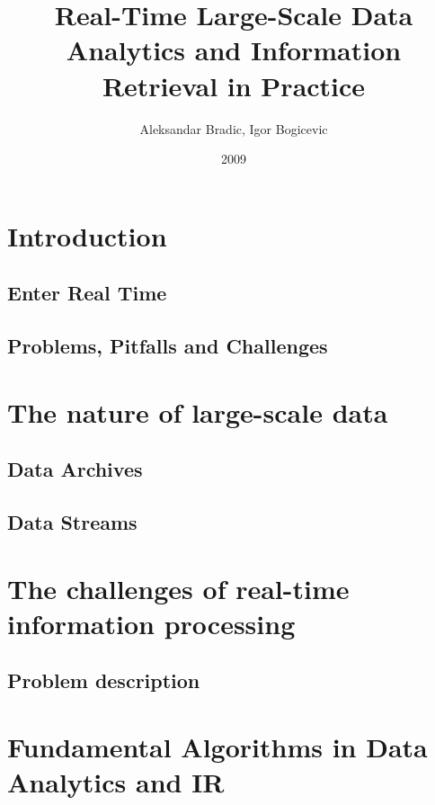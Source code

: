 \documentclass[]{book}    %
\begin{document}
\author{Aleksandar Bradic, Igor Bogicevic}
\date{2009}
\title{Real-Time Large-Scale Data Analytics and Information Retrieval in Practice}

\maketitle 

  \frontmatter 
  \tableofcontents 


\mainmatter 

\chapter{Introduction}
\label{altrings} %

\section{Enter Real Time}
\section{Problems, Pitfalls and Challenges}

\chapter{The nature of large-scale data}
\section{Data Archives}
\section{Data Streams}

\chapter{The challenges of real-time information processing}
\section{Problem description}

\chapter{Fundamental Algorithms in Data Analytics and IR}
\end{document}
